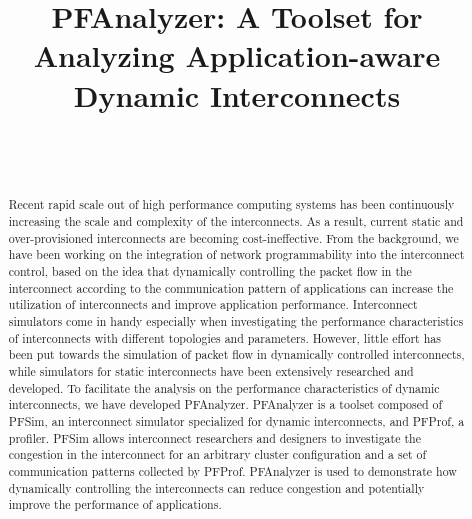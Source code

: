 \documentclass[conference]{IEEEtran}
\begin{document}
\title{PFAnalyzer: A Toolset for Analyzing Application-aware Dynamic Interconnects}

\author{%
     \\
     \\
}

\maketitle

\begin{abstract}
    Recent rapid scale out of high performance computing systems has
    been continuously increasing the scale and complexity of the
    interconnects. As a result, current static and over-provisioned
    interconnects are becoming cost-ineffective. From the background, we have
    been working on the integration of network programmability into
    the interconnect control, based on the idea that dynamically controlling
    the packet flow in the interconnect according to the communication pattern
    of applications can increase the utilization of interconnects and improve
    application performance. Interconnect simulators come in handy especially
    when investigating the performance characteristics of interconnects with
    different topologies and parameters. However, little effort has been put
    towards the simulation of packet flow in dynamically controlled interconnects,
    while simulators for static interconnects have been extensively researched
    and developed. To facilitate the analysis on the performance
    characteristics of dynamic interconnects, we have developed PFAnalyzer.
    PFAnalyzer is a toolset composed of PFSim, an interconnect simulator
    specialized for dynamic interconnects, and PFProf, a profiler.
    PFSim allows interconnect researchers and designers to investigate the
    congestion in the interconnect for an arbitrary cluster configuration and
    a set of communication patterns collected by PFProf. PFAnalyzer is used
    to demonstrate how dynamically controlling the interconnects can reduce
    congestion and potentially improve the performance of applications.
\end{abstract}
\end{document}
